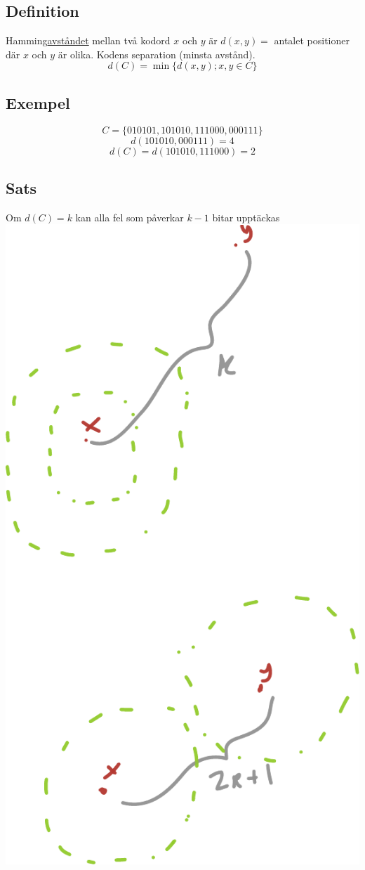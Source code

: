 \documentclass{article}
\begin{document}
\subsection{Definition}
Hamming\uline{avståndet} mellan två kodord $x$ och $y$ är
$d(x,y)=$ antalet positioner där $x$ och $y$ är olika.
Kodens separation (minsta avstånd).
$$d(C)=\min \{d(x,y);x,y\in C\}$$

\subsection{Exempel}
$$ C=\{010101, 101010, 111000, 000111\} $$
$$ d(101010, 000111) = 4$$
$$ d(C) = d(101010, 111000) = 2$$

\subsection{Sats}
Om $d(C)=k$ kan alla fel som påverkar $k-1$ bitar upptäckas\\
\includegraphics[scale=0.5]{img/img1.pdf}
\end{document}
